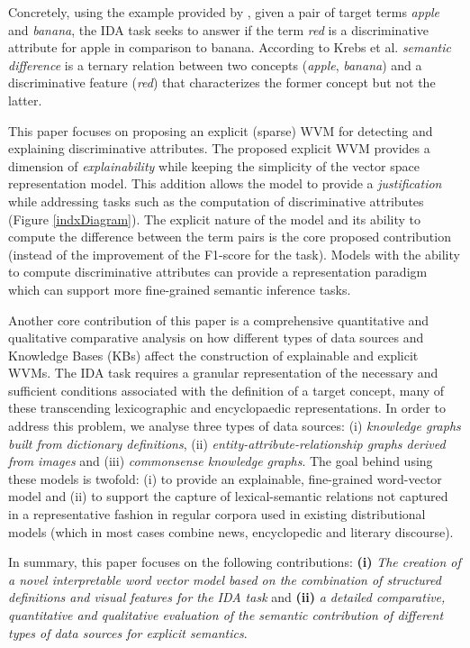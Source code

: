 \documentclass[11pt,a4paper]{article}
\begin{document}
Concretely, using the example provided by \cite{semeval2018task10}, given a pair of target terms \emph{apple} and \emph{banana}, the IDA task seeks to answer if the term \emph{red} is a discriminative attribute for apple in comparison to banana. According to Krebs et al. \emph{semantic difference} is a ternary relation between two concepts (\textit{apple}, \textit{banana}) and a discriminative feature (\textit{red}) that characterizes the former concept but not the latter.



This paper focuses on proposing an explicit (sparse) WVM for detecting and explaining discriminative attributes. The proposed explicit WVM provides a dimension of \textit{explainability} while keeping the simplicity of the vector space representation model. This addition allows the model to provide a \textit{justification} while addressing tasks such as the computation of discriminative attributes (Figure \ref{indxDiagram}). The explicit nature of the model and its ability to compute the difference between the term pairs is the core proposed contribution (instead of the improvement of the F1-score for the task). Models with the ability to compute discriminative attributes can provide a representation paradigm which can support more fine-grained semantic inference tasks.  

Another core contribution of this paper is a comprehensive quantitative and qualitative comparative analysis on how different types of data sources and Knowledge Bases (KBs) affect the construction of explainable and explicit WVMs. The IDA task requires a granular representation of the necessary and sufficient conditions associated with the definition of a target concept, many of these transcending lexicographic and encyclopaedic representations. In order to address this problem, we analyse three types of data sources: (i) \textit{knowledge graphs built from dictionary definitions}, (ii) \textit{entity-attribute-relationship graphs derived from images} and (iii) \textit{commonsense knowledge graphs}. The goal behind using these models is twofold: (i) to provide an explainable, fine-grained word-vector model and (ii) to support the capture of lexical-semantic relations not captured in a representative fashion in regular corpora used in existing distributional models (which in most cases combine news, encyclopedic and literary discourse). 

In summary, this paper focuses on the following contributions: \textbf{(i)} \textit{The creation of a novel interpretable word vector model based on the combination of structured definitions and visual features for the IDA task} and \textbf{(ii)} \textit{a detailed comparative, quantitative and qualitative evaluation of the semantic contribution of different types of data sources for explicit semantics}.
\end{document}
